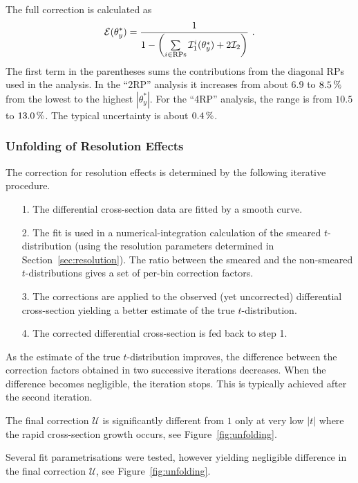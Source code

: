 The full correction is calculated as
\begin{equation}
\label{efficiency}
	\mathcal{E}(\theta_y^*) = {1\over 1 - \left( \sum\limits_{i\in \rm RPs} \mathcal{I}^i_1(\theta_y^*) + 2 \mathcal{I}_2 \right) } \ .
\end{equation}
The first term in the parentheses sums the contributions from the diagonal RPs used in the analysis. In the ``2RP'' analysis it increases from about $6.9$ to $8.5\,{\rm \%}$ from the lowest to the highest $|\theta_y^*|$. For the ``4RP'' analysis, the range is from $10.5$ to $13.0\,{\rm \%}$. The typical uncertainty is about $0.4\,{\rm \%}$.




\subsubsection{Unfolding of Resolution Effects}
\label{sec:unfolding}

The correction for resolution effects is determined by the following iterative procedure.
\begin{itemize}
\item[1.] The differential cross-section data are fitted by a smooth curve.
\item[2.] The fit is used in a numerical-integration calculation of the smeared $t$-distribution (using the resolution parameters determined in Section~\ref{sec:resolution}). The ratio between the smeared and the non-smeared $t$-distributions gives a set of per-bin correction factors.
\item[3.] The corrections are applied to the observed (yet uncorrected) differential cross-section yielding a better estimate of the true $t$-distribution.
\item[4.] The corrected differential cross-section is fed back to step 1.
\end{itemize}
As the estimate of the true $t$-distribution improves, the difference between the correction factors obtained in two successive iterations decreases. When the difference becomes negligible, the iteration stops. This is typically achieved after the second iteration. 

The final correction $\mathcal{U}$ is significantly different from $1$ only at very low $|t|$ where the rapid cross-section growth occurs, see Figure~\ref{fig:unfolding}.

Several fit parametrisations were tested, however yielding negligible difference in the final correction $\mathcal{U}$, see Figure~\ref{fig:unfolding}.

